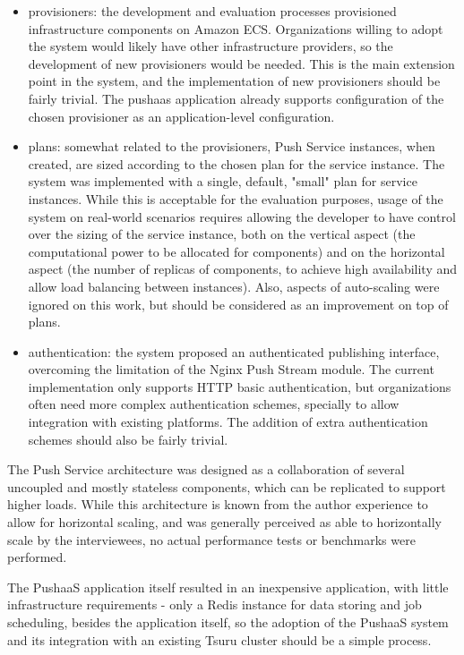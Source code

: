 \begin{itemize}
    \item provisioners: the development and evaluation processes provisioned infrastructure components on Amazon ECS. Organizations willing to adopt the system would likely have other infrastructure providers, so the development of new provisioners would be needed. This is the main extension point in the system, and the implementation of new provisioners should be fairly trivial. The pushaas application already supports configuration of the chosen provisioner as an application-level configuration.
    \item plans: somewhat related to the provisioners, Push Service instances, when created, are sized according to the chosen plan for the service instance. The system was implemented with a single, default, "small" plan for service instances. While this is acceptable for the evaluation purposes, usage of the system on real-world scenarios requires allowing the developer to have control over the sizing of the service instance, both on the vertical aspect (the computational power to be allocated for components) and on the horizontal aspect (the number of replicas of components, to achieve high availability and allow load balancing between instances). Also, aspects of auto-scaling were ignored on this work, but should be considered as an improvement on top of plans.
    \item authentication: the system proposed an authenticated publishing interface, overcoming the limitation of the Nginx Push Stream module. The current implementation only supports HTTP basic authentication, but organizations often need more complex authentication schemes, specially to allow integration with existing platforms. The addition of extra authentication schemes should also be fairly trivial.
\end{itemize}

The Push Service architecture was designed as a collaboration of several uncoupled and mostly stateless components, which can be replicated to support higher loads. While this architecture is known from the author experience to allow for horizontal scaling, and was generally perceived as able to horizontally scale by the interviewees, no actual performance tests or benchmarks were performed.

The PushaaS application itself resulted in an inexpensive application, with little infrastructure requirements - only a Redis instance for data storing and job scheduling, besides the application itself, so the adoption of the PushaaS system and its integration with an existing Tsuru cluster should be a simple process.
